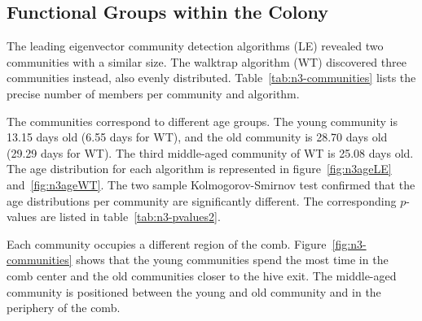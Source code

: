 \subsection{Functional Groups within the Colony}
The leading eigenvector community detection algorithms (LE) revealed two communities with a similar size. The walktrap algorithm (WT) discovered three communities instead, also evenly distributed. Table~\ref{tab:n3-communities} lists the precise number of members per community and algorithm.

The communities correspond to different age groups. The young community is 13.15 days old (6.55 days for WT), and the old community is 28.70 days old (29.29 days for WT). The third middle-aged community of WT is 25.08 days old. The age distribution for each algorithm is represented in figure~\ref{fig:n3ageLE} and~\ref{fig:n3ageWT}. The two sample Kolmogorov-Smirnov test confirmed that the age distributions per community are significantly different. The corresponding $p$-values are listed in table~\ref{tab:n3-pvalues2}.

Each community occupies a different region of the comb.
Figure~\ref{fig:n3-communities} shows that the young communities spend the most time in the comb center and the old communities closer to the hive exit. The middle-aged community is positioned between the young and old community and in the periphery of the comb.




